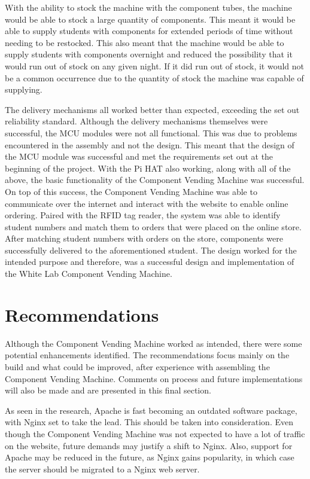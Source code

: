 \documentclass[a4paper,11pt]{article}
\numberwithin{figure}{section}
\numberwithin{table}{section}
\begin{document}
With the ability to stock the machine with the component tubes, the machine would be able to stock a large quantity of components. This meant it would be able to supply students with components for extended periods of time without needing to be restocked. This also meant that the machine would be able to supply students with components overnight and reduced the possibility that it would run out of stock on any given night. If it did run out of stock, it would not be a common occurrence due to the quantity of stock the machine was capable of supplying.

The delivery mechanisms all worked better than expected, exceeding the set out reliability standard. Although the delivery mechanisms themselves were successful, the MCU modules were not all functional. This was due to problems encountered in the assembly and not the design. This meant that the design of the MCU module was successful and met the requirements set out at the beginning of the project. With the Pi HAT also working, along with all of the above, the basic functionality of the Component Vending Machine was successful. On top of this success, the Component Vending Machine was able to communicate over the internet and interact with the website to enable online ordering. Paired with the RFID tag reader, the system was able to identify student numbers and match them to orders that were placed on the online store. After matching student numbers with orders on the store, components were successfully delivered to the aforementioned student. The design worked for the intended purpose and therefore, was a successful design and implementation of the White Lab Component Vending Machine.

\newpage

\section{Recommendations}\thispagestyle{sectionstart}
Although the Component Vending Machine worked as intended, there were some potential enhancements identified. The recommendations focus mainly on the build and what could be improved, after experience with assembling the Component Vending Machine. Comments on process and future implementations will also be made and are presented in this final section.

As seen in the research, Apache is fast becoming an outdated software package, with Nginx set to take the lead. This should be taken into consideration. Even though the Component Vending Machine was not expected to have a lot of traffic on the website, future demands may justify a shift to Nginx. Also, support for Apache may be reduced in the future, as Nginx gains popularity, in which case the server should be migrated to a Nginx web server. 
\end{document}
